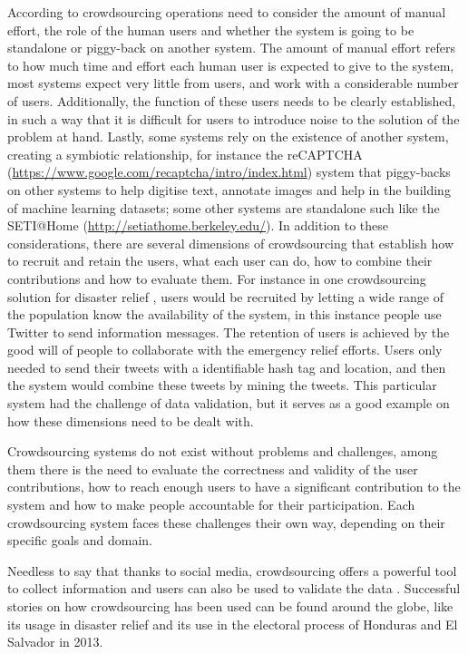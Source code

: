 \documentclass[letterpaper,10pt]{article}
\begin{document}
According to \cite{doan2011} crowdsourcing operations need to consider the amount of manual effort, the role of the human users and whether the system is going to be standalone or piggy-back on another system. The amount of manual effort refers to how much time and effort each human user is expected to give to the system, most systems expect very little from users, and work with a considerable number of users. Additionally, the function of these users needs to be clearly established, in such a way that it is difficult for users to introduce noise to the solution of the problem at hand. Lastly, some systems rely on the existence of another system, creating a symbiotic relationship, for instance the reCAPTCHA (\url{https://www.google.com/recaptcha/intro/index.html}) system that piggy-backs on other systems to help digitise text, annotate images and help in the building of machine learning datasets; some other systems are standalone such like the SETI@Home (\url{http://setiathome.berkeley.edu/}). In addition to these considerations, there are several dimensions of crowdsourcing that establish how to recruit and retain the users, what each user can do, how to combine their contributions and how to evaluate them. For instance in one crowdsourcing solution for disaster relief \citep{gao2011}, users would be recruited by letting a wide range of the population know the availability of the system, in this instance people use Twitter to send information messages. The retention of users is achieved by the good will of people to collaborate with the emergency relief efforts. Users only needed to send their tweets with a identifiable hash tag and location, and then the system would combine these tweets by mining the tweets. This particular system had the challenge of data validation, but it serves as a good example on how these dimensions need to be dealt with.

Crowdsourcing systems do not exist without problems and challenges, among them there is the need to evaluate the correctness and validity of the user contributions, how to reach enough users to have a significant contribution to the system and how to make people accountable for their participation. Each crowdsourcing system faces these challenges their own way, depending on their specific goals and domain.

Needless to say that thanks to social media, crowdsourcing offers a powerful tool to collect information and users can also be used to validate the data \citep{gao2011}. Successful stories on how crowdsourcing has been used can be found around the globe, like its usage in disaster relief \citep{yin2012, gao2011} and its use in the electoral process of Honduras and El Salvador in 2013.
\end{document}
